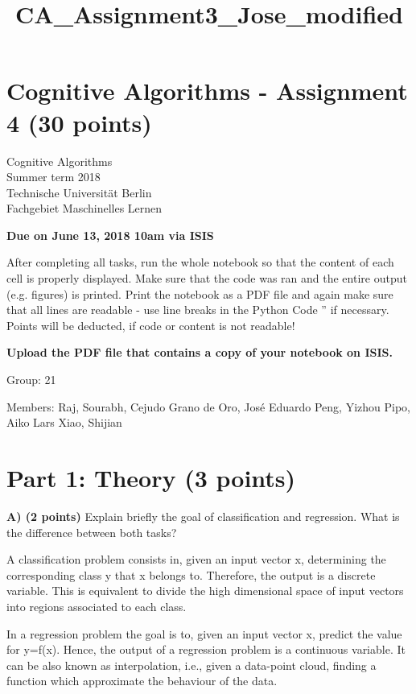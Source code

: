 \documentclass[11pt]{article}
\title{CA\_Assignment3\_Jose\_modified}
\begin{document}
    
    
    \maketitle
    
    

    
    \section{Cognitive Algorithms - Assignment 4 (30
points)}\label{cognitive-algorithms---assignment-4-30-points}

Cognitive Algorithms\\
Summer term 2018\\
Technische Universität Berlin\\
Fachgebiet Maschinelles Lernen

\textbf{Due on June 13, 2018 10am via ISIS }

After completing all tasks, run the whole notebook so that the content
of each cell is properly displayed. Make sure that the code was ran and
the entire output (e.g. figures) is printed. Print the notebook as a PDF
file and again make sure that all lines are readable - use line breaks
in the Python Code '' if necessary. Points will be deducted, if code or
content is not readable!

\textbf{Upload the PDF file that contains a copy of your notebook on
ISIS.}

    Group: 21

Members: Raj, Sourabh, Cejudo Grano de Oro, José Eduardo Peng, Yizhou
Pipo, Aiko Lars Xiao, Shijian

    \section{Part 1: Theory (3 points)}\label{part-1-theory-3-points}

\textbf{A) (2 points)} Explain briefly the goal of classification and
regression. What is the difference between both tasks?

    A classification problem consists in, given an input vector x,
determining the corresponding class y that x belongs to. Therefore, the
output is a discrete variable. This is equivalent to divide the high
dimensional space of input vectors into regions associated to each
class.

In a regression problem the goal is to, given an input vector x, predict
the value for y=f(x). Hence, the output of a regression problem is a
continuous variable. It can be also known as interpolation, i.e., given
a data-point cloud, finding a function which approximate the behaviour
of the data.
\end{document}
